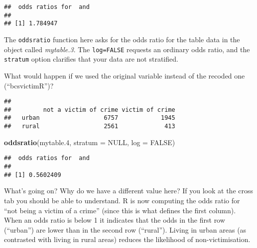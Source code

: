 \documentclass[
]{book}
\newenvironment{Shaded}{\begin{snugshade}}{\end{snugshade}}
\newcommand{\AttributeTok}[1]{\textcolor[rgb]{0.13,0.29,0.53}{#1}}
\newcommand{\ConstantTok}[1]{\textcolor[rgb]{0.56,0.35,0.01}{#1}}
\newcommand{\FloatTok}[1]{\textcolor[rgb]{0.00,0.00,0.81}{#1}}
\newcommand{\FunctionTok}[1]{\textcolor[rgb]{0.13,0.29,0.53}{\textbf{#1}}}
\newcommand{\NormalTok}[1]{#1}
\newcommand{\OtherTok}[1]{\textcolor[rgb]{0.56,0.35,0.01}{#1}}
\newcommand{\SpecialCharTok}[1]{\textcolor[rgb]{0.81,0.36,0.00}{\textbf{#1}}}
\begin{document}
\begin{verbatim}
##  odds ratios for  and  
## 
## [1] 1.784947
\end{verbatim}

The \texttt{oddsratio} function here asks for the odds ratio for the table data in the object called \emph{mytable.3}. The \texttt{log=FALSE} requests an ordinary odds ratio, and the \texttt{stratum} option clarifies that your data are not stratified.

What would happen if we used the original variable instead of the recoded one (``bcsvictimR'')?

\begin{Shaded}
\end{Shaded}

\begin{verbatim}
##        
##         not a victim of crime victim of crime
##   urban                  6757            1945
##   rural                  2561             413
\end{verbatim}

\begin{Shaded}
\begin{Highlighting}[]
\FunctionTok{oddsratio}\NormalTok{(mytable}\FloatTok{.4}\NormalTok{, }\AttributeTok{stratum =} \ConstantTok{NULL}\NormalTok{, }\AttributeTok{log =} \ConstantTok{FALSE}\NormalTok{)}
\end{Highlighting}
\end{Shaded}

\begin{verbatim}
##  odds ratios for  and  
## 
## [1] 0.5602409
\end{verbatim}

What's going on? Why do we have a different value here? If you look at the cross tab you should be able to understand. R is now computing the odds ratio for ``not being a victim of a crime'' (since this is what defines the first column). When an odds ratio is below 1 it indicates that the odds in the first row (``urban'') are lower than in the second row (``rural''). Living in urban areas (as contrasted with living in rural areas) reduces the likelihood of non-victimisation.
\end{document}
